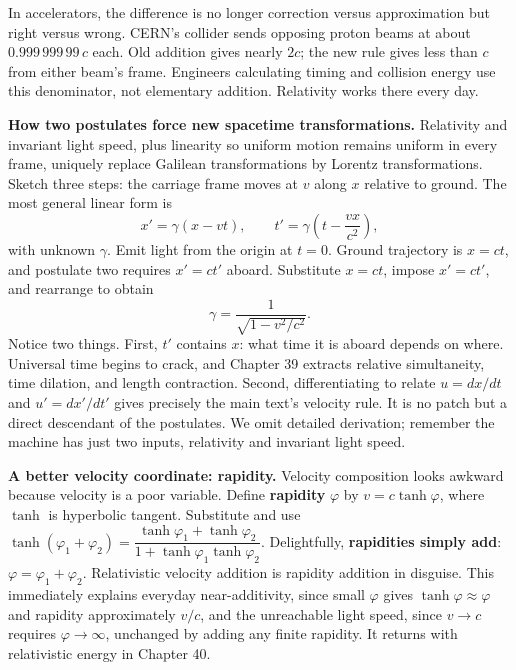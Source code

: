 In accelerators, the difference is no longer correction versus approximation but right versus wrong. CERN's collider sends opposing proton beams at about \(0.999\,999\,99\,c\) each. Old addition gives nearly \(2c\); the new rule gives less than \(c\) from either beam's frame. Engineers calculating timing and collision energy use this denominator, not elementary addition. Relativity works there every day.

\begin{mathbridge}
\textbf{How two postulates force new spacetime transformations.} Relativity and invariant light speed, plus linearity so uniform motion remains uniform in every frame, uniquely replace Galilean transformations by Lorentz transformations. Sketch three steps: the carriage frame moves at \(v\) along \(x\) relative to ground. The most general linear form is
\[
x'=\gamma(x-vt),\qquad t'=\gamma\!\left(t-\frac{vx}{c^{2}}\right),
\]
with unknown \(\gamma\). Emit light from the origin at \(t=0\). Ground trajectory is \(x=ct\), and postulate two requires \(x'=ct'\) aboard. Substitute \(x=ct\), impose \(x'=ct'\), and rearrange to obtain
\[
\gamma=\frac{1}{\sqrt{1-v^{2}/c^{2}}}.
\]
Notice two things. First, \(t'\) contains \(x\): what time it is aboard depends on where. Universal time begins to crack, and Chapter 39 extracts relative simultaneity, time dilation, and length contraction. Second, differentiating to relate \(u=dx/dt\) and \(u'=dx'/dt'\) gives precisely the main text's velocity rule. It is no patch but a direct descendant of the postulates. We omit detailed derivation; remember the machine has just two inputs, relativity and invariant light speed.
\end{mathbridge}

\begin{challenge}
\textbf{A better velocity coordinate: rapidity.} Velocity composition looks awkward because velocity is a poor variable. Define \textbf{rapidity} \(\varphi\) by \(v=c\tanh\varphi\), where \(\tanh\) is hyperbolic tangent. Substitute and use \(\tanh(\varphi_1+\varphi_2)=\dfrac{\tanh\varphi_1+\tanh\varphi_2}{1+\tanh\varphi_1\tanh\varphi_2}\). Delightfully, \textbf{rapidities simply add}: \(\varphi=\varphi_1+\varphi_2\). Relativistic velocity addition is rapidity addition in disguise. This immediately explains everyday near-additivity, since small \(\varphi\) gives \(\tanh\varphi\approx\varphi\) and rapidity approximately \(v/c\), and the unreachable light speed, since \(v\to c\) requires \(\varphi\to\infty\), unchanged by adding any finite rapidity. It returns with relativistic energy in Chapter 40.
\end{challenge}

